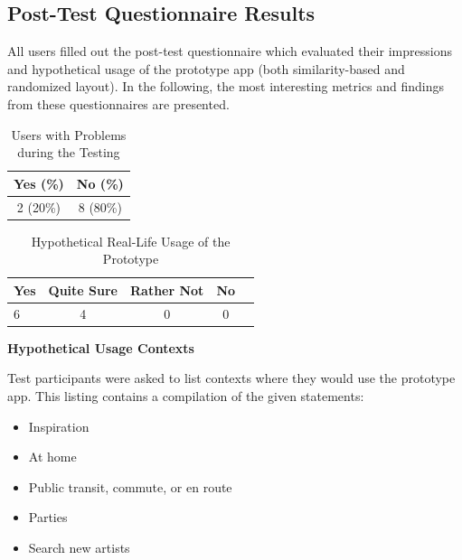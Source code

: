 \subsection{Post-Test Questionnaire Results}

All users filled out the post-test questionnaire which evaluated their impressions and hypothetical usage of the prototype app (both similarity-based and randomized layout). In the following, the most interesting metrics and findings from these questionnaires are presented.

\begin{table}[H]
\begin{center}
\begin{tabular}{ | c | c | }
	\hline
	\textbf{Yes (\%)} & \textbf{No (\%)} \\ \hline
	2 (20\%) & 8 (80\%) \\ \hline
\end{tabular}
\caption {Users with Problems during the Testing} \label{tab:problems-during-testing} 
\end{center}
\end{table}

\begin{table}[H]
\begin{center}
\begin{tabular}{ | l | c | c | c | c |}
	\hline
	\textbf{Yes} & \textbf{Quite Sure} & \textbf{Rather Not} & \textbf{No}\\ \hline
	6 & 4 & 0 & 0 \\ \hline
\end{tabular}
\caption {Hypothetical Real-Life Usage of the Prototype} \label{tab:hypothetical-prototype-usage} 
\end{center}
\end{table}

\textbf{Hypothetical Usage Contexts}

Test participants were asked to list contexts where they would use the prototype app. This listing contains a compilation of the given statements:

\begin{itemize}
	\item Inspiration
	\item At home
	\item Public transit, commute, or en route
	\item Parties
	\item Search new artists
\end{itemize}

